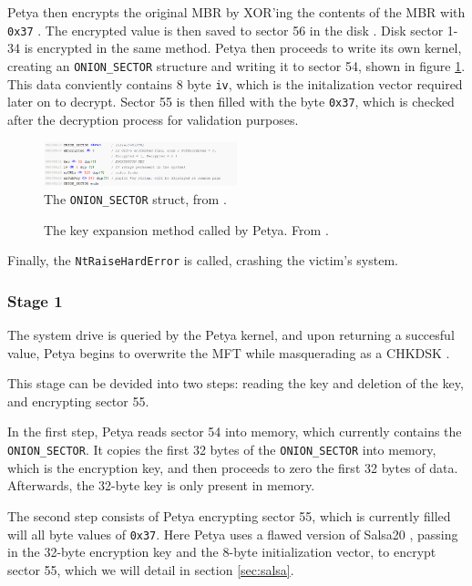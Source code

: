 \documentclass[twocolumn]{article}
\newcommand{\code}[1]{\texttt{#1}}
\begin{document}
Petya then encrypts the original MBR by XOR'ing the contents of the MBR with \code{0x37} \cite{breakingPetya}. The encrypted value is then saved to sector 56 in the disk \cite{xrayPetya}. Disk sector 1-34 is encrypted in the same method. Petya then proceeds to write its own kernel, creating an \code{ONION\_SECTOR} structure and writing it to sector 54, shown in figure \ref{fig:onion_sector}. This data conviently contains 8 byte \code{iv}, which is the initalization vector required later on to decrypt. Sector 55 is then filled with the byte \code{0x37}, which is checked after the decryption process for validation purposes.

\begin{figure}
	\includegraphics[width = 0.5\textwidth]{onion_sector.png}
	\caption{The \code{ONION\_SECTOR} struct, from \cite{decryptPetya}. }
	\label{fig:onion_sector}	
\end{figure}

\begin{figure}
	
	\caption{The key expansion method called by Petya. From \cite{decryptPetya}.}
	\label{ls:key_expand}
\end{figure}

Finally, the \code{NtRaiseHardError} is called, crashing the victim's system. 

\subsubsection{Stage 1}
The system drive is queried by the Petya kernel, and upon returning a succesful value, Petya begins to overwrite the MFT while masquerading as a CHKDSK \cite{xrayPetya}. 

This stage can be devided into two steps: reading the key and deletion of the key, and encrypting sector 55. 

In the first step, Petya reads sector 54 into memory, which currently contains the \code{ONION\_SECTOR}. It copies the first 32 bytes of the \code{ONION\_SECTOR} into memory, which is the encryption key, and then proceeds to zero the first 32 bytes of data. Afterwards, the 32-byte key is only present in memory. 

The second step consists of Petya encrypting sector 55, which is currently filled will all byte values of \code{0x37}. Here Petya uses a flawed version of Salsa20 \cite{salsa20Spec}, passing in the 32-byte encryption key and the 8-byte initialization vector, to encrypt sector 55, which we will detail in section \ref{sec:salsa}.
\end{document}
